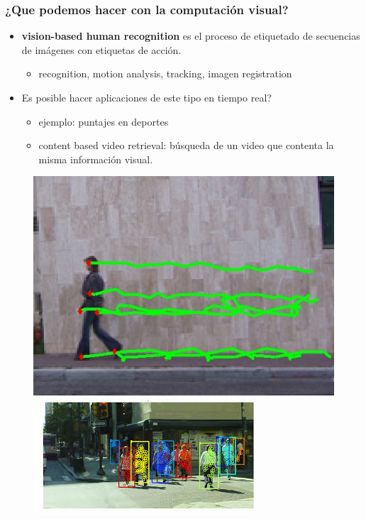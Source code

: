 \documentclass{beamer}
\begin{document}
\begin{frame}
\frametitle{¿Que podemos hacer con la computación visual?}
 
\begin{itemize}
\item \textbf{vision-based human recognition} es el proceso de etiquetado de secuencias de imágenes con etiquetas de acción.
	 \begin{itemize}
	 \item recognition, motion analysis, tracking, imagen registration
 
	 \end{itemize}
\item Es posible hacer aplicaciones de este tipo en tiempo real?
	\begin{itemize}
	\item ejemplo: puntajes en deportes
	\item content based video retrieval: 
		búsqueda de un video que contenta la misma información visual.
 
	\end{itemize}
\end{itemize}
 
\begin{figure}
\includegraphics[width=0.2\linewidth]{img2/dariawalk.jpg}
\includegraphics[width=0.4\linewidth]{img2/download.jpg}
 
\end{figure}
 
\end{frame}
 


 
\end{document}

